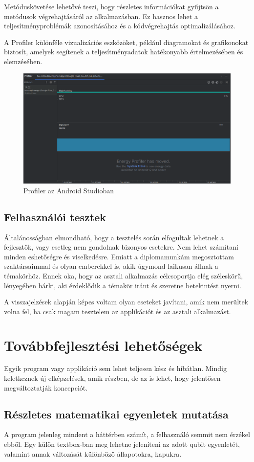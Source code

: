 \documentclass[
]{thesis-ekf}
\theoremstyle{definition}
\theoremstyle{remark}
\begin{document}
Metóduskövetése lehetővé teszi, hogy részletes információkat gyűjtsön a metódusok végrehajtásáról az alkalmazásban. Ez hasznos lehet a teljesítményproblémák azonosításához és a kódvégrehajtás optimalizálásához.

A Profiler különféle vizualizációs eszközöket, például diagramokat és grafikonokat biztosít, amelyek segítenek a teljesítményadatok hatékonyabb értelmezésében és elemzésében.

\begin{figure}[H]
	\centering
	\includegraphics[width=0.5\linewidth]{Profiler}
	\caption{Profiler az Android Studioban}
	\label{fig:profiler}
\end{figure}

\subsection{Felhasználói tesztek}
Általánosságban elmondható, hogy a tesztelés során elfogultak lehetnek a fejlesztők, vagy esetleg nem gondolnak bizonyos esetekre. Nem lehet számítani minden eshetőségre és viselkedésre. Emiatt a diplomamunkám megosztottam szaktársaimmal és olyan emberekkel is, akik úgymond laikusan állnak a témakörhöz. Ennek oka, hogy az asztali alkalmazás célcsoportja elég széleskörű, lényegében bárki, aki érdeklődik a témakör iránt és szeretne betekintést nyerni.

A visszajelzések alapján képes voltam olyan eseteket javítani, amik nem merültek volna fel, ha csak magam tesztelem az applikációt és az asztali alkalmazást.

\section{Továbbfejlesztési lehetőségek}
Egyik program vagy applikáció sem lehet teljesen kész és hibátlan. Mindig keletkeznek új elképzelések, amik részben, de az is lehet, hogy jelentősen megváltoztatják koncepciót.
\subsection{Részletes matematikai egyenletek mutatása}
A program jelenleg mindent a háttérben számít, a felhasználó semmit nem érzékel ebből. Egy külön textbox-ban meg lehetne jeleníteni az adott qubit egyenletét, valamint annak változását különböző állapotokra, kapukra.
\end{document}
